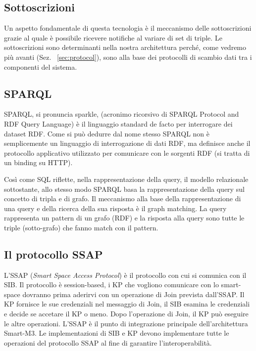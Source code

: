 \subsection{Sottoscrizioni}

Un aspetto fondamentale di questa tecnologia è il meccanismo delle sottoscrizioni grazie al quale è possibile ricevere notifiche al variare di set di triple. Le sottoscrizioni sono determinanti nella nostra architettura perché, come vedremo più avanti (Sez. ~\ref{sec:protocol}), sono alla base dei protocolli di scambio dati tra i componenti del sistema.

\subsection{SPARQL}

SPARQL, si pronuncia sparkle, (acronimo ricorsivo di SPARQL Protocol and RDF Query Language) è il linguaggio standard de facto per interrogare dei dataset RDF. Come si può dedurre dal nome stesso SPARQL non è semplicemente un linguaggio di interrogazione di dati RDF, ma definisce anche il protocollo applicativo utilizzato per comunicare con le sorgenti RDF (si tratta di un binding su HTTP).

Così come SQL riflette, nella rappresentazione della query, il modello relazionale sottostante, allo stesso modo SPARQL basa la rappresentazione della query sul concetto di tripla e di grafo. Il meccanismo alla base della rappresentazione di una query e della ricerca della sua risposta è il graph matching. La query rappresenta un pattern di un grafo (RDF) e la risposta alla query sono tutte le triple (sotto-grafo) che fanno match con il pattern.

\subsection{Il protocollo SSAP}

L'SSAP (\emph{Smart Space Access Protocol}) è il protocollo con cui si comunica con il SIB. Il protocollo è session-based, i KP che vogliono comunicare con lo smart-space dovranno prima aderirvi con un operazione di Join prevista dall'SSAP. Il KP fornisce le sue credenziali nel messaggio di Join, il SIB esamina le credenziali e decide se accetare il KP o meno. Dopo l'operazione di Join, il KP può eseguire le altre operazioni. 
L'SSAP è il punto di integrazione principale dell'architettura Smart-M3. Le implementazioni di SIB e KP devono implementare tutte le operazioni del protocollo SSAP al fine di garantire l'interoperabilità.

